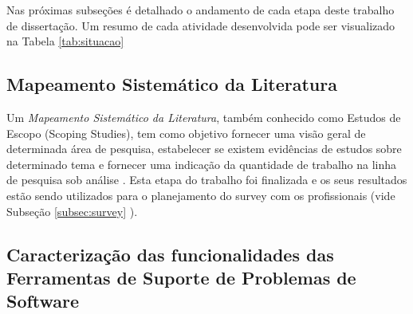 \documentclass[10pt,a4paper]{report}
\begin{document}
Nas próximas subseções é detalhado o andamento de cada etapa deste trabalho de dissertação. Um resumo de cada atividade desenvolvida pode ser visualizado na Tabela \ref{tab:situacao}

\begin{table}[ht]
	\centering
	\caption{Situação das Atividades da Dissertação}
	\label{tab:situacao}
\end{table}


\subsection{Mapeamento Sistemático da Literatura}
\label{subsec:revisao_sistematica}

Um \textit{Mapeamento Sistemático da Literatura}, também conhecido como Estudos de Escopo (Scoping Studies), tem como objetivo fornecer uma visão geral de determinada área de pesquisa, estabelecer se existem evidências de estudos sobre determinado tema e fornecer uma indicação da quantidade de trabalho na linha de pesquisa sob análise \cite{keele2007guidelines,wohlin2012experimentation}. Esta etapa do trabalho foi finalizada e os  seus resultados estão sendo utilizados para o planejamento do survey com os profissionais (vide Subseção \ref{subsec:survey} ).

\subsection{Caracterização das funcionalidades das Ferramentas de Suporte de Problemas de Software }
\label{subsec:caracterizacao}
\end{document}
